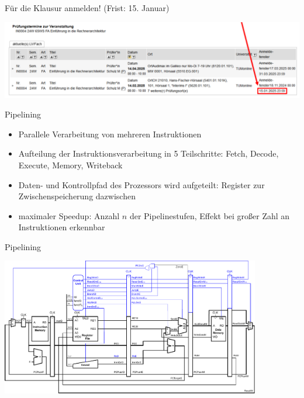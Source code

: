 \documentclass[
  german,            %
  aspectratio=169,    %
]{tumbeamer}
\begin{document}
\begin{frame}[c]{Für die Klausur anmelden! (Frist: 15. Januar)}{}
	\begin{center}
		\includegraphics[width=\textwidth]{w11_klausuranmeldung.png}
	\end{center}
\end{frame}

\begin{frame}[fragile, c]{Pipelining}{}
	\begin{itemize}
		\item Parallele Verarbeitung von mehreren Instruktionen
		\item Aufteilung der Instruktionsverarbeitung in 5 Teilschritte: Fetch, Decode, Execute, Memory, Writeback
		\item Daten- und Kontrollpfad des Prozessors wird aufgeteilt: Register zur Zwischenspeicherung dazwischen
		\item maximaler Speedup: Anzahl $n$ der Pipelinestufen, Effekt bei großer Zahl an Instruktionen erkennbar
	\end{itemize}
\end{frame}

\begin{frame}[fragile, c]{Pipelining}{}
	\begin{center}
		\includegraphics[width=0.85\textwidth]{w11_pipelined.pdf}
	\end{center}
\end{frame}
\end{document}
